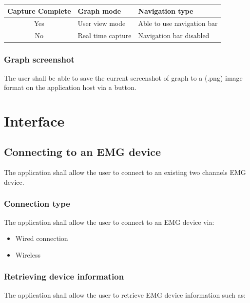 \documentclass[12pt,a4paper]{article}
\begin{document}
\begin{table}[htbp]
	\centering
	\begin{tabular}{|c|l|l|}
		\hline
		\textbf{Capture Complete} & \textbf{Graph mode}  & \textbf{Navigation type} \\
		\hline
		Yes & User view mode & Able to use navigation bar\\
		\hline
		No & Real time capture & Navigation bar disabled \\
		\hline
	\end{tabular}
\end{table}


\subsubsection{Graph screenshot}

The user shall be able to save the current screenshot of graph to a (.png) image format on the application host via a button.

\newpage

\section{Interface}

\subsection{Connecting to an EMG device}

The application shall allow the user to connect to an existing two channels EMG device.

\subsubsection{Connection type}

The application shall allow the user to connect to an EMG device via:

\begin{itemize}
\item Wired connection
\item Wireless
\end{itemize}

\subsubsection{Retrieving device information}

The application shall allow the user to retrieve EMG device information such as: 
\end{document}

